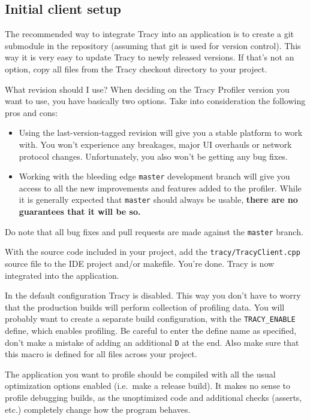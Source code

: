 \documentclass[hidelinks,titlepage,a4paper]{article}
\begin{document}
\subsection{Initial client setup}

The recommended way to integrate Tracy into an application is to create a git submodule in the repository (assuming that git is used for version control). This way it is very easy to update Tracy to newly released versions. If that's not an option, copy all files from the Tracy checkout directory to your project.

\begin{bclogo}[
noborder=true,
couleur=black!5,
logo=\bclampe
]{What revision should I use?}
When deciding on the Tracy Profiler version you want to use, you have basically two options. Take into consideration the following pros and cons:

\begin{itemize}
\item Using the last-version-tagged revision will give you a stable platform to work with. You won't experience any breakages, major UI overhauls or network protocol changes. Unfortunately, you also won't be getting any bug fixes.
\item Working with the bleeding edge \texttt{master} development branch will give you access to all the new improvements and features added to the profiler. While it is generally expected that \texttt{master} should always be usable, \textbf{there are no guarantees that it will be so.}
\end{itemize}

Do note that all bug fixes and pull requests are made against the \texttt{master} branch.
\end{bclogo}

With the source code included in your project, add the \texttt{tracy/TracyClient.cpp} source file to the IDE project and/or makefile. You're done. Tracy is now integrated into the application.

In the default configuration Tracy is disabled. This way you don't have to worry that the production builds will perform collection of profiling data. You will probably want to create a separate build configuration, with the \texttt{TRACY\_ENABLE} define, which enables profiling. Be careful to enter the define name as specified, don't make a mistake of adding an additional \texttt{D} at the end. Also make sure that this macro is defined for all files across your project.

The application you want to profile should be compiled with all the usual optimization options enabled (i.e.~make a release build). It makes no sense to profile debugging builds, as the unoptimized code and additional checks (asserts, etc.) completely change how the program behaves.
\end{document}
